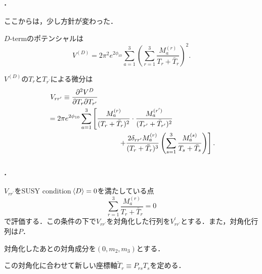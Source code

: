 \documentclass[
  a4paper,uplatex,dvipdfmx,10pt,
  xcolor = {dvipsnames,svgnames},
  hyperref ={colorlinks=true,citecolor=Navy,linkcolor=NavyBlue,urlcolor=purple}
]{beamer}
\begin{document}
\begin{frame}
  \frametitle{\thesection.\thesubsection\ \subsecname}

  \color{DarkMagenta}
  ここからは，少し方針が変わった．
  \color{gray}

  $D$-termのポテンシャルは
  \begin{equation}
    V^{(D)}
    =
    2\pi^2 e^{2\phi_{10}}
    \sum_{a=1}^{3}
    \left(
      \sum_{r=1}^{3}\frac{M_{a}^{(r)}}{T_{r}+\bar{T}_{r}}
    \right)^2
    .
    \nonumber
  \end{equation}

  \vspace{10pt}

  $V^{(D)}$の$T_{r}$と$T_{r^{\prime}}$による微分は
  \begin{align}
    &\ 
    V_{rr^{\prime}}
    \equiv
    \pdv{V^{D}}{T_{r}}{T_{r^{\prime}}}
    \nonumber
    \\
    &=
    2\pi e^{2\phi_{10}}
    \sum_{a=1}^{3}
    \left[  
      \frac{M_{a}^{(r)}}{(T_{r}+\bar{T}_{r})^2}
      \cdot
      \frac{M_{a}^{(r')}}{(T_{r'}+\bar{T}_{r'})^2}
    \right.
    \nonumber
    \\
    &\hspace{3.5cm}
    \left.
      +
      \frac{2\delta_{rr'}M_{a}^{(r)}}{(T_{r}+\bar{T}_{r})^3}
      \left(  
        \sum_{s=1}^{3}\frac{M_{a}^{(s)}}{T_{s}+\bar{T}_{s}}
      \right)
    \right]
    .
    \nonumber
  \end{align}

\end{frame}

\begin{frame}
  \frametitle{\thesection.\thesubsection\ \subsecname}
  \color{gray}

  $V_{rr^{\prime}}$をSUSY condition$\ev*{D}=0$を満たしている点
  \begin{equation}
    \sum_{r=1}^{3}
    \frac{M_{a}^{(r)}}{T_{r}+\bar{T}_{r}}  
    =
    0
    \nonumber  
  \end{equation}
  で評価する．この条件の下で$V_{rr^{\prime}}$を対角化した行列を$V^{\prime}_{rr^{\prime}}$とする．また，対角化行列は$P$．

  \vspace{10pt}

  対角化したあとの対角成分を$(0,m_2,m_3)$とする．

  \vspace{10pt}
  
  この対角化に合わせて新しい座標軸$\tilde{T}_{r}\equiv P_{rs}T_{s}$を定める．

\end{frame}
\end{document}
